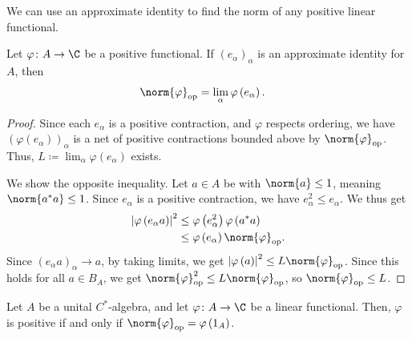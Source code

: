 \documentclass[10pt]{mypackage}
\DeclareMathOperator{\op}{op}
\begin{document}
We can use an approximate identity to find the norm of any positive linear functional.
\begin{proposition}
  Let $\varphi\colon A\rightarrow \C$ be a positive functional. If $\left(e_{\alpha}\right)_{\alpha}$ is an approximate identity for $A$, then
  \begin{align*}
    \norm{\varphi}_{\op} &= \lim_{\alpha}\varphi\left(e_{\alpha}\right).
  \end{align*}
\end{proposition}
\begin{proof}
  Since each $e_{\alpha}$ is a positive contraction, and $\varphi$ respects ordering, we have $\left(\varphi\left(e_{\alpha}\right)\right)_{\alpha}$ is a net of positive contractions bounded above by $\norm{\varphi}_{\op}$. Thus, $L\coloneq \lim_{\alpha}\varphi\left(e_\alpha\right)$ exists.\newline

  We show the opposite inequality. Let $a\in A$ be with $\norm{a}\leq 1$, meaning $\norm{a^{\ast}a}\leq 1$. Since $e_{\alpha}$ is a positive contraction, we have $e_{\alpha}^2 \leq e_{\alpha}$. We thus get
  \begin{align*}
    \left\vert \varphi\left(e_{\alpha}a\right) \right\vert^2 &\leq \varphi\left(e_{\alpha}^2\right)\varphi\left(a^{\ast}a\right)\\
                                                             &\leq \varphi\left(e_{\alpha}\right)\norm{\varphi}_{\op}.
  \end{align*}
  Since $\left(e_{\alpha}a\right)_{\alpha}\rightarrow a$, by taking limits, we get $\left\vert \varphi\left(a\right) \right\vert^2 \leq L\norm{\varphi}_{\op}$. Since this holds for all $a\in B_A$, we get $\norm{\varphi}_{\op}^2 \leq L\norm{\varphi}_{\op}$, so $\norm{\varphi}_{\op}\leq L$.
\end{proof}
\begin{proposition}
  Let $A$ be a unital $C^{\ast}$-algebra, and let $\varphi\colon A\rightarrow \C$ be a linear functional. Then, $\varphi$ is positive if and only if $\norm{\varphi}_{\op} = \varphi\left(1_A\right)$.
\end{proposition}
\end{document}
